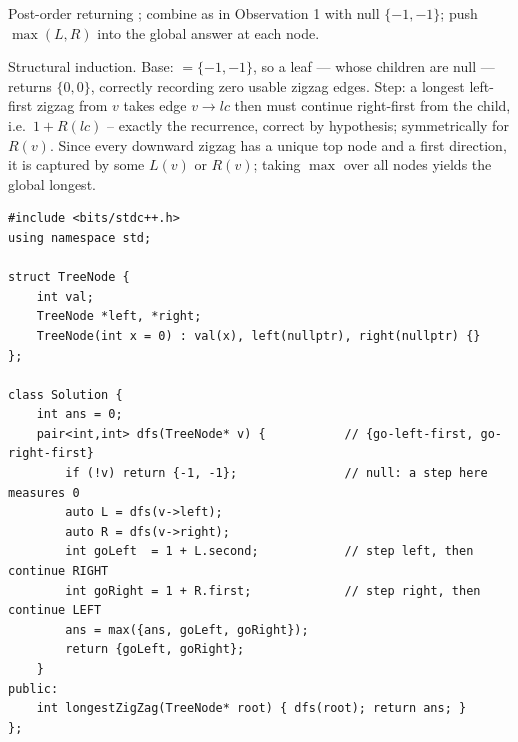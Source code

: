 \begin{thinkbox}
\end{thinkbox}

Post-order returning ; combine as in Observation 1 with null
$\{-1,-1\}$; push $\max(L,R)$ into the global answer at each node.

\begin{proofbox}
Structural induction. Base: $=\{-1,-1\}$, so a leaf — whose
children are null — returns $\{0,0\}$, correctly recording zero usable zigzag
edges. Step: a longest left-first zigzag from $v$ takes edge $v\to\mathit{lc}$ then
must continue right-first from the child, i.e.\ $1+R(\mathit{lc})$ -- exactly the
recurrence, correct by hypothesis; symmetrically for $R(v)$. Since every
downward zigzag has a unique top node and a first direction, it is captured by
some $L(v)$ or $R(v)$; taking $\max$ over all nodes yields the global longest.
\end{proofbox}

\begin{lstlisting}[caption={Longest ZigZag Path (LeetCode 1372) -- bottom-up direction pair}, label={lst:c02-zigzag}]
#include <bits/stdc++.h>
using namespace std;

struct TreeNode {
    int val;
    TreeNode *left, *right;
    TreeNode(int x = 0) : val(x), left(nullptr), right(nullptr) {}
};

class Solution {
    int ans = 0;
    pair<int,int> dfs(TreeNode* v) {           // {go-left-first, go-right-first}
        if (!v) return {-1, -1};               // null: a step here measures 0
        auto L = dfs(v->left);
        auto R = dfs(v->right);
        int goLeft  = 1 + L.second;            // step left, then continue RIGHT
        int goRight = 1 + R.first;             // step right, then continue LEFT
        ans = max({ans, goLeft, goRight});
        return {goLeft, goRight};
    }
public:
    int longestZigZag(TreeNode* root) { dfs(root); return ans; }
};
\end{lstlisting}

